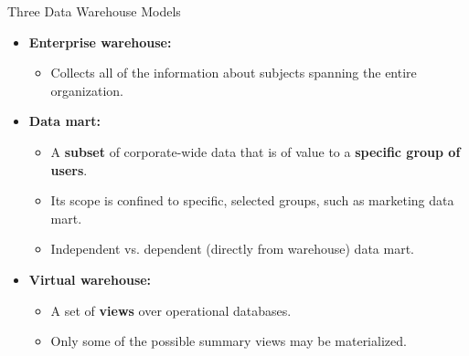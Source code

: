 \begin{frame}{Three Data Warehouse Models}
  \begin{itemize}
  \item \textbf{\color{airforceblue}Enterprise warehouse:}
    \begin{itemize}
    \item Collects all of the information about subjects spanning the entire organization.
    \end{itemize}
  \item \textbf{\color{airforceblue}Data mart:}
    \begin{itemize}
    \item A \textbf{\color{airforceblue}subset} of corporate-wide data that is of value to a \textbf{\color{airforceblue}specific group of users}.
    \item Its scope is confined to specific, selected groups, such as marketing data mart.
    \item Independent vs. dependent (directly from warehouse) data mart.
    \end{itemize}
  \item \textbf{\color{airforceblue}Virtual warehouse:}
    \begin{itemize}
    \item A set of \textbf{\color{airforceblue}views} over operational databases.
    \item Only some of the possible summary views may be materialized.
    \end{itemize}
  \end{itemize}
\end{frame}

